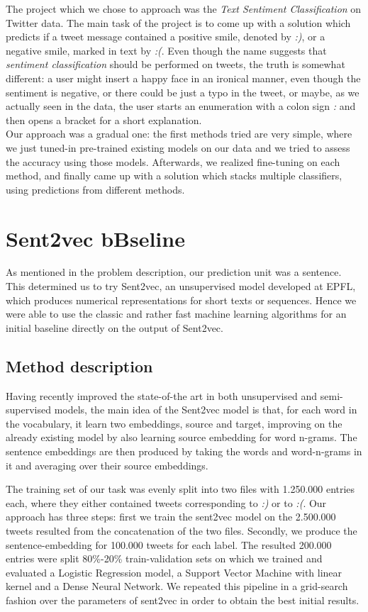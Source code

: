 \documentclass[10pt,conference,compsocconf]{IEEEtran}
\begin{document}
The project which we chose to approach was the \textit{Text Sentiment Classification} on Twitter data. The main task of the project is to come up with a solution which predicts if a tweet message contained a positive smile, denoted by \textit{:)}, or a negative smile, marked in text by \textit{:(}. Even though the name suggests that \textit{sentiment classification} should be performed on tweets, the truth is somewhat different: a user might insert a happy face in an ironical manner, even though the sentiment is negative, or there could be just a typo in the tweet, or maybe, as we actually seen in the data, the user starts an enumeration with a colon sign \textit{:} and then opens a bracket for a short explanation. \\

Our approach was a gradual one: the first methods tried are very simple, where we just tuned-in pre-trained existing models on our data and we tried to assess the accuracy using those models. Afterwards, we realized fine-tuning on each method, and finally came up with a solution which stacks multiple classifiers, using predictions from different methods. 

\section{Sent2vec bBseline}
As mentioned in the problem description, our prediction unit was a sentence. This determined us to try Sent2vec\cite{PGJ17}, an unsupervised model developed at EPFL, which produces numerical representations for short texts or sequences. Hence we were able to use the classic and rather fast machine learning algorithms for an initial baseline directly on the output of Sent2vec. 
\subsection{Method description}
Having recently improved the state-of-the art in both unsupervised and semi-supervised models, the main idea of the Sent2vec model is that, for each word in the vocabulary, it learn two embeddings, source and target, improving on the already existing model \cite{MCCD13} by also learning source embedding for word n-grams. The sentence embeddings are then produced by taking the words and word-n-grams in it and averaging over their source embeddings. 

The training set of our task was evenly split into two files with 1.250.000 entries each, where they either contained tweets corresponding to \textit{:)} or to \textit{:(}. Our approach has three steps: first we train the sent2vec model on the 2.500.000 tweets resulted from the concatenation of the two files. Secondly, we produce the sentence-embedding for 100.000 tweets for each label. The resulted 200.000 entries were split 80\%-20\%  train-validation sets on which we trained and evaluated a Logistic Regression model, a Support Vector Machine with linear kernel and a Dense Neural Network. We repeated this pipeline in a grid-search fashion over the parameters of sent2vec in order to obtain the best initial results.
\end{document}
